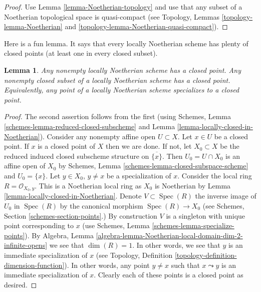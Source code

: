 \documentclass{stacks-project}
\theoremstyle{plain}
\newtheorem{lemma}[subsection]{Lemma}
\theoremstyle{definition}
\theoremstyle{remark}
\numberwithin{equation}{subsection}
\def\Spec{\mathop{\mathrm{Spec}}}
\begin{document}
\begin{proof}
Use Lemma \ref{lemma-Noetherian-topology}
and use that any subset of a Noetherian topological
space is quasi-compact (see Topology,
Lemmas \ref{topology-lemma-Noetherian} and
\ref{topology-lemma-Noetherian-quasi-compact}).
\end{proof}

\noindent
Here is a fun lemma.
It says that every locally Noetherian scheme has plenty of
closed points (at least one in every closed subset).

\begin{lemma}
\label{lemma-locally-Noetherian-closed-point}
Any nonempty locally Noetherian scheme has a closed point.
Any nonempty closed subset of a locally Noetherian scheme has a closed point.
Equivalently, any point of a locally Noetherian scheme specializes
to a closed point.
\end{lemma}

\begin{proof}
The second assertion follows from the first (using
Schemes, Lemma \ref{schemes-lemma-reduced-closed-subscheme}
and Lemma \ref{lemma-locally-closed-in-Noetherian}).
Consider any nonempty affine open $U \subset X$.
Let $x \in U$ be a closed point. If $x$ is a closed point
of $X$ then we are done. If not, let $X_0 \subset X$ be the
reduced induced closed subscheme structure on $\overline{\{x\}}$.
Then $U_0 = U \cap X_0$ is an affine open of $X_0$ by
Schemes, Lemma \ref{schemes-lemma-closed-subspace-scheme} and
$U_0 = \{x\}$. Let $y \in X_0$, $y \not = x$ be a specialization of $x$.
Consider the local ring $R = \mathcal{O}_{X_0, y}$.
This is a Noetherian local ring as $X_0$ is Noetherian
by Lemma \ref{lemma-locally-closed-in-Noetherian}. Denote $V \subset \Spec(R)$
the inverse image of $U_0$ in $\Spec(R)$ by the canonical morphism
$\Spec(R) \to X_0$ (see Schemes, Section \ref{schemes-section-points}.)
By construction $V$ is a singleton with unique point corresponding to $x$ (use
Schemes, Lemma \ref{schemes-lemma-specialize-points}).
By
Algebra, Lemma \ref{algebra-lemma-Noetherian-local-domain-dim-2-infinite-opens}
we see that $\dim(R) = 1$.
In other words, we see that $y$ is an immediate specialization
of $x$ (see Topology, Definition \ref{topology-definition-dimension-function}).
In other words, any
point $y \not = x$ such that $x \leadsto y$ is an immediate
specialization of $x$. Clearly each of these points is a
closed point as desired.
\end{proof}
\end{document}
